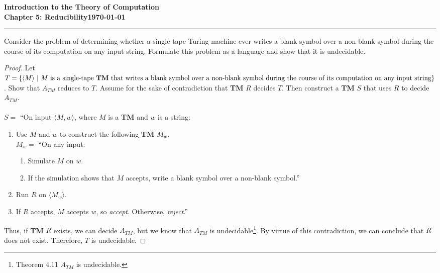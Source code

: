 \documentclass[11pt]{article}
\newcommand{\dated}{\today}
\begin{document}
\textbf{Introduction to the Theory of
Computation}\hfill\textbf{\myname}\\[0.01in]
\textbf{Chapter 5: Reducibility}\hfill\textbf{\dated}\\
\smallskip\hrule\bigskip

\begin{problem}{5.12}
Consider the problem of determining whether a single-tape Turing machine ever writes a blank symbol over a non-blank symbol during the course of its computation on any input string. Formulate this problem as a language and show that it is undecidable.
\end{problem}

\begin{proof}
Let $T = \{\langle M \rangle \ | \ M \text{ is a single-tape \textbf{TM} that writes a blank symbol over a non-blank} \\ \text{ symbol during the course of its computation on any input string}\}$. Show that $A_{TM}$ reduces to $T$. Assume for the sake of contradiction that \textbf{TM} $R$ decides $T$. Then construct a \textbf{TM} $S$ that uses $R$ to decide $A_{TM}$.  \\
\\
$S =$ \textquotedblleft On input $\langle M, w \rangle$, where $M$ is a \textbf{TM} and $w$ is a string:
\begin{enumerate}
\item Use $M$ and $w$ to construct the following \textbf{TM} $M_w$. \\
$M_w =$ \textquotedblleft On any input:
\begin{enumerate}[1.]
\item Simulate $M$ on $w$.
\item If the simulation shows that $M$ accepts, write a blank symbol over a non-blank symbol.\textquotedblright
\end{enumerate}
\item Run $R$ on $\langle M_w \rangle$.
\item If $R$ accepts, $M$ accepts $w$, so \textit{accept}. Otherwise, \textit{reject}.\textquotedblright
\end{enumerate}
Thus, if \textbf{TM} $R$ exists, we can decide $A_{TM}$, but we know that $A_{TM}$ is undecidable\footnote{Theorem 4.11 $A_{TM}$ is undecidable.}. By virtue of this contradiction, we can conclude that $R$ does not exist. Therefore, $T$ is undecidable.
\end{proof}
\end{document}
